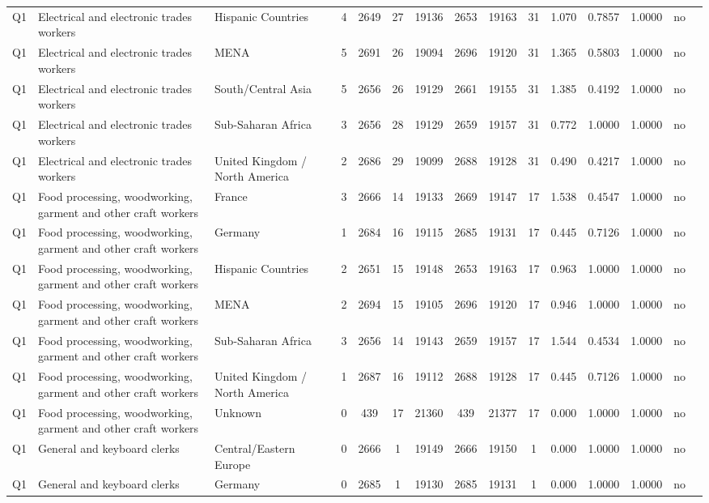 \begin{longtable}{lllrcccccccccll}
Q1 & Electrical and electronic trades workers & Hispanic Countries & 4 & 2649 & 27 & 19136 & 2653 & 19163 & 31 & 1.070 & 0.7857 & 1.0000 & no \\
Q1 & Electrical and electronic trades workers & MENA & 5 & 2691 & 26 & 19094 & 2696 & 19120 & 31 & 1.365 & 0.5803 & 1.0000 & no \\
Q1 & Electrical and electronic trades workers & South/Central Asia & 5 & 2656 & 26 & 19129 & 2661 & 19155 & 31 & 1.385 & 0.4192 & 1.0000 & no \\
Q1 & Electrical and electronic trades workers & Sub-Saharan Africa & 3 & 2656 & 28 & 19129 & 2659 & 19157 & 31 & 0.772 & 1.0000 & 1.0000 & no \\
Q1 & Electrical and electronic trades workers & United Kingdom / North America & 2 & 2686 & 29 & 19099 & 2688 & 19128 & 31 & 0.490 & 0.4217 & 1.0000 & no \\
Q1 & Food processing, woodworking, garment and other craft workers & France & 3 & 2666 & 14 & 19133 & 2669 & 19147 & 17 & 1.538 & 0.4547 & 1.0000 & no \\
Q1 & Food processing, woodworking, garment and other craft workers & Germany & 1 & 2684 & 16 & 19115 & 2685 & 19131 & 17 & 0.445 & 0.7126 & 1.0000 & no \\
Q1 & Food processing, woodworking, garment and other craft workers & Hispanic Countries & 2 & 2651 & 15 & 19148 & 2653 & 19163 & 17 & 0.963 & 1.0000 & 1.0000 & no \\
Q1 & Food processing, woodworking, garment and other craft workers & MENA & 2 & 2694 & 15 & 19105 & 2696 & 19120 & 17 & 0.946 & 1.0000 & 1.0000 & no \\
Q1 & Food processing, woodworking, garment and other craft workers & Sub-Saharan Africa & 3 & 2656 & 14 & 19143 & 2659 & 19157 & 17 & 1.544 & 0.4534 & 1.0000 & no \\
Q1 & Food processing, woodworking, garment and other craft workers & United Kingdom / North America & 1 & 2687 & 16 & 19112 & 2688 & 19128 & 17 & 0.445 & 0.7126 & 1.0000 & no \\
Q1 & Food processing, woodworking, garment and other craft workers & Unknown & 0 & 439 & 17 & 21360 & 439 & 21377 & 17 & 0.000 & 1.0000 & 1.0000 & no \\
Q1 & General and keyboard clerks & Central/Eastern Europe & 0 & 2666 & 1 & 19149 & 2666 & 19150 & 1 & 0.000 & 1.0000 & 1.0000 & no \\
Q1 & General and keyboard clerks & Germany & 0 & 2685 & 1 & 19130 & 2685 & 19131 & 1 & 0.000 & 1.0000 & 1.0000 & no \\

\end{longtable}
